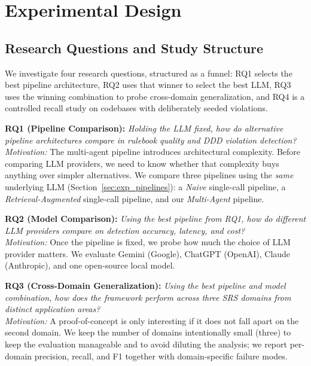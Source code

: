 \documentclass[smallextended]{svjour3}
\begin{document}
\section{Experimental Design}
\label{sec:experimental_design}

\subsection{Research Questions and Study Structure}
\label{sec:exp_rqs}

We investigate four research questions, structured as a funnel: RQ1 selects the best pipeline architecture, RQ2 uses that winner to select the best LLM, RQ3 uses the winning combination to probe cross-domain generalization, and RQ4 is a controlled recall study on codebases with deliberately seeded violations.

\textbf{RQ1 (Pipeline Comparison):} \emph{Holding the LLM fixed, how do alternative pipeline architectures compare in rulebook quality and DDD violation detection?}
\\
\textit{Motivation:} The multi-agent pipeline introduces architectural complexity.
Before comparing LLM providers, we need to know whether that complexity buys anything over simpler alternatives.
We compare three pipelines using the \emph{same} underlying LLM (Section~\ref{sec:exp_pipelines}): a \emph{Naive} single-call pipeline, a \emph{Retrieval-Augmented} single-call pipeline, and our \emph{Multi-Agent} pipeline.

\textbf{RQ2 (Model Comparison):} \emph{Using the best pipeline from RQ1, how do different LLM providers compare on detection accuracy, latency, and cost?}
\\
\textit{Motivation:} Once the pipeline is fixed, we probe how much the choice of LLM provider matters.
We evaluate Gemini (Google), ChatGPT (OpenAI), Claude (Anthropic), and one open-source local model.

\textbf{RQ3 (Cross-Domain Generalization):} \emph{Using the best pipeline and model combination, how does the framework perform across three SRS domains from distinct application areas?}
\\
\textit{Motivation:} A proof-of-concept is only interesting if it does not fall apart on the second domain.
We keep the number of domains intentionally small (three) to keep the evaluation manageable and to avoid diluting the analysis; we report per-domain precision, recall, and F1 together with domain-specific failure modes.
\end{document}
